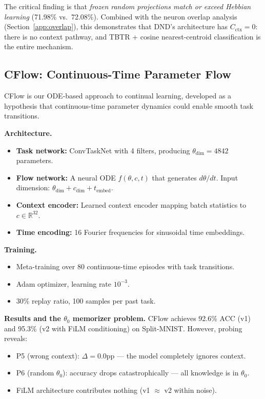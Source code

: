 \documentclass{article}
\begin{document}
The critical finding is that \emph{frozen random projections match or exceed Hebbian learning} (71.98\% vs.\ 72.08\%). Combined with the neuron overlap analysis (Section~\ref{app:overlap}), this demonstrates that DND's architecture has $C_\mathrm{ctx} = 0$: there is no context pathway, and TBTR + cosine nearest-centroid classification is the entire mechanism.


\subsection{CFlow: Continuous-Time Parameter Flow}
\label{app:cflow}

CFlow is our ODE-based approach to continual learning, developed as a hypothesis that continuous-time parameter dynamics could enable smooth task transitions.

\textbf{Architecture.}
\begin{itemize}
    \item \textbf{Task network:} ConvTaskNet with 4 filters, producing $\theta_\mathrm{dim} = 4842$ parameters.
    \item \textbf{Flow network:} A neural ODE $f(\theta, c, t)$ that generates $d\theta/dt$. Input dimension: $\theta_\mathrm{dim} + c_\mathrm{dim} + t_\mathrm{embed}$.
    \item \textbf{Context encoder:} Learned context encoder mapping batch statistics to $c \in \mathbb{R}^{32}$.
    \item \textbf{Time encoding:} 16 Fourier frequencies for sinusoidal time embeddings.
\end{itemize}

\textbf{Training.}
\begin{itemize}
    \item Meta-training over 80 continuous-time episodes with task transitions.
    \item Adam optimizer, learning rate $10^{-3}$.
    \item 30\% replay ratio, 100 samples per past task.
\end{itemize}

\textbf{Results and the $\theta_0$ memorizer problem.}
CFlow achieves 92.6\% ACC (v1) and 95.3\% (v2 with FiLM conditioning) on Split-MNIST. However, probing reveals:
\begin{itemize}
    \item P5 (wrong context): $\Delta = 0.0$pp --- the model completely ignores context.
    \item P6 (random $\theta_0$): accuracy drops catastrophically --- all knowledge is in $\theta_0$.
    \item FiLM architecture contributes nothing (v1 $\approx$ v2 within noise).
\end{itemize}
\end{document}
